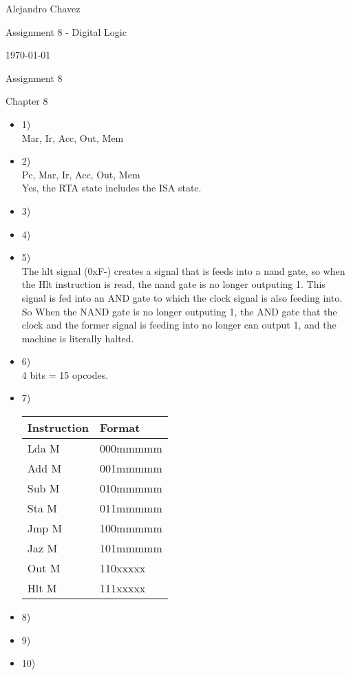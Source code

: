 \documentclass{article}
\begin{document}
\hfill Alejandro Chavez

\hfill Assignment 8 - Digital Logic

\hfill \today\\

\begin{center}\begin{large}Assignment 8\end{large}\end{center}	
Chapter 8
\begin{itemize}
  \item
    1)\\
    Mar, Ir, Acc, Out, Mem\\
  \item
    2)\\
    Pc, Mar, Ir, Acc, Out, Mem\\
    Yes, the RTA state includes the ISA state.\\
  \item
    3)\\

  \item
    4)\\
  \item
    5)\\
    The hlt signal (0xF-) creates a signal that is feeds into a nand gate, so when the Hlt instruction is read, the nand gate is no longer outputing 1. This signal is fed into an AND gate to which the clock signal is also feeding into. So When the NAND gate is no longer outputing 1, the AND gate that the clock and the former signal is feeding into no longer can output 1, and the machine is literally halted.\\
  \item
    6)\\
    4 bits = 15 opcodes.\\
  \item
    7)\\
  \begin{tabular}{l|l}
  Instruction & Format \\ \hline
  Lda M & 000mmmmm \\
  Add M & 001mmmmm \\
  Sub M & 010mmmmm \\
  Sta M & 011mmmmm \\
  Jmp M & 100mmmmm \\
  Jaz M & 101mmmmm \\
  Out M & 110xxxxx \\
  Hlt M & 111xxxxx \\
  \end{tabular}
  \item
    8)\\
  \item
    9)\\
  \item
    10)\\
\end{itemize}
\end{document}
